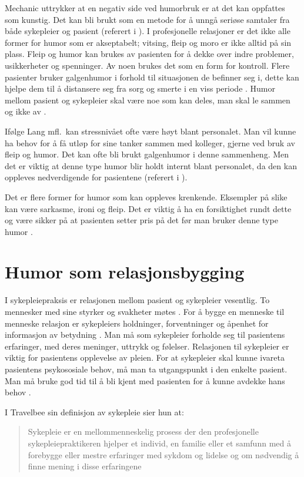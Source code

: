 Mechanic uttrykker at en negativ side ved humorbruk er at det kan
oppfattes som kunstig. Det kan bli brukt som en metode for å unngå seriøse
samtaler fra både sykepleier og pasient (referert i ).
I profesjonelle relasjoner er det ikke alle former for humor som er
akseptabelt; vitsing, fleip og moro er ikke alltid på sin plass. Fleip og humor
kan brukes av pasienten for å dekke over indre problemer, usikkerheter og
spenninger. Av noen brukes det som en form for kontroll. Flere pasienter bruker
galgenhumor i forhold til situasjonen de befinner seg i, dette kan hjelpe dem
til å distansere seg fra sorg og smerte i en viss periode
\cite[s.~56]{bohn2000}. Humor mellom pasient og sykepleier skal være noe som
kan deles, man skal le sammen og ikke av \cite[s.~166]{wist2002}.

Ifølge Lang mfl.~kan stressnivået ofte være høyt blant personalet. Man vil
kunne ha behov for å få utløp for sine tanker sammen med kolleger, gjerne ved
bruk av fleip og humor. Det kan ofte bli brukt galgenhumor i denne sammenheng.
Men det er viktig at denne type humor blir holdt internt blant personalet, da
den kan oppleves nedverdigende for pasientene (referert i
).

Det er flere former for humor som kan oppleves krenkende. Eksempler på slike
kan være sarkasme, ironi og fleip. Det er viktig å ha en forsiktighet rundt
dette og være sikker på at pasienten setter pris på det før man bruker denne
type humor \cite[s.~246]{eide2008}.

\section{Humor som relasjonsbygging}

I sykepleiepraksis er relasjonen mellom pasient og sykepleier vesentlig. To
mennesker med sine styrker og svakheter møtes \cite[s.~889]{eriksen2015}. For å
bygge en menneske til menneske relasjon er sykepleiers holdninger,
forventninger og åpenhet for informasjon av betydning
\cite[s.~89]{brataas2011}. Man må som sykepleier forholde seg til pasientens
erfaringer, med deres meninger, uttrykk og følelser.
Relasjonen til sykepleier er viktig for pasientens opplevelse av pleien. For at
sykepleier skal kunne ivareta pasientens psykososiale behov, må man ta
utgangspunkt i den enkelte pasient.  Man må bruke god tid til å bli kjent med
pasienten for å kunne avdekke hans behov \cite[s.~889--901]{eriksen2015}.

I Travelbee sin definisjon av sykepleie sier hun at:
\blockquote[{}]{Sykepleie er en mellommenneskelig
prosess der den profesjonelle sykepleiepraktikeren hjelper et individ, en
familie eller et samfunn med å forebygge eller mestre erfaringer med sykdom og
lidelse og om nødvendig å finne mening i disse erfaringene}.

